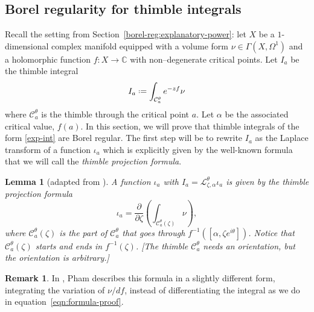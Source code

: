 \documentclass{article}
\newcommand{\C}{\mathbb{C}}
\newcommand*{\defeq}{\mathrel{\vcenter{\baselineskip0.5ex \lineskiplimit0pt
                     \hbox{\scriptsize.}\hbox{\scriptsize.}}}%
                     =}
\newcommand{\laplace}{\mathcal{L}}
\theoremstyle{definition}
\newtheorem{remark}[definition]{Remark}
\theoremstyle{plain}
\newtheorem{lemma}[definition]{Lemma}
\newenvironment{todo}{\color{Coral}}{\color{black}}
\newenvironment{draft}{\color{SlateBlue}}{\color{black}}
\begin{document}
\subsection{Borel regularity for thimble integrals}\label{borel-reg-thimble}
%
\begin{draft}Recall the setting from Section~\ref{borel-reg:explanatory-power}: let $X$ be a $1$-dimensional complex manifold equipped with a volume form $\nu\in\Gamma(X,\Omega^1)$ and a holomorphic function $f\colon X\to\C$ with non--degenerate critical points. Let $I_a$ be the thimble integral 
\begin{equation}\label{exp-int}
I_a \defeq \int_{\mathcal{C}_a^\theta} e^{-zf} \nu
\end{equation}
where $\mathcal{C}_a^\theta$ is the thimble through the critical point $a$. Let $\alpha$ be the associated critical value, $f(a)$. In this section, we will prove that thimble integrals of the form \eqref{exp-int} are Borel regular. The first step will be to rewrite $I_a$ as the Laplace transform of a function $\iota_a$ which is explicitly given by the well-known formula that we will call the \textit{thimble projection formula}.\end{draft}
\begin{lemma}[adapted from {\cite[Section~3.3]{pham}}]\label{lem:thimble_proj_formula-proof}
A function $\iota_a$ with $I_a = \laplace_{\zeta, \alpha}^\theta \iota_a$ is given by the {\em thimble projection formula}
\begin{equation}\label{eqn:formula-proof}
    \iota_a = \frac{\partial}{\partial \zeta} \left( \int_{\mathcal{C}_a^\theta(\zeta)}\nu \right),
\end{equation}
where $\mathcal{C}_a^\theta(\zeta)$ is the part of $\mathcal{C}_a^\theta$ that goes through $f^{-1}([\alpha,\zeta e^{i\theta}])$. Notice that $\mathcal{C}_a^\theta(\zeta)$ starts and ends in $f^{-1}(\zeta)$. \begin{todo}[The thimble $\mathcal{C}_a^\theta$ needs an orientation, but the orientation is arbitrary.]\end{todo}
\end{lemma}
\begin{remark}
In \cite{pham}, Pham describes this formula in a slightly different form, integrating the variation of $\nu/df$, instead of differentiating the integral as we do in equation~\eqref{eqn:formula-proof}.
\end{remark}
\end{document}
